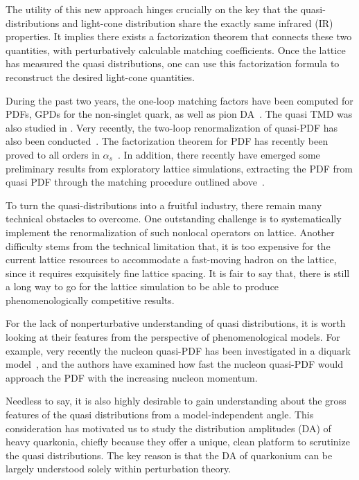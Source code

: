 \documentclass[english,preprint,aps,prd,showpacs,superscriptaddress,nofootinbib,tightenlines]{revtex4}
\begin{document}
The utility of this new approach hinges crucially on the key that the quasi-distributions and
light-cone distribution share the exactly same infrared (IR) properties. It implies there exists a factorization theorem that connects these two quantities,
with perturbatively calculable matching coefficients.
Once the lattice has measured the quasi distributions, one can use this factorization formula to reconstruct
the desired light-cone quantities.

During the past two years, the one-loop matching factors have been computed for PDFs, GPDs for the non-singlet quark,
as well as pion DA~\cite{Xiong:2013bka,Ma:2014jla,Ji:2015qla}. The quasi TMD was also studied in \cite{Ji:2014hxa}.
Very recently, the two-loop renormalization of quasi-PDF has also been conducted~\cite{Ji:2015jwa}.
The factorization theorem for PDF has recently been proved to all orders in $\alpha_s$~\cite{Ma:2014jla}.
In addition, there recently have emerged some preliminary results from exploratory lattice simulations, extracting
the PDF from quasi PDF through the matching procedure outlined above~\cite{Lin:2014zya,Alexandrou:2015rja}.

To turn the quasi-distributions into a fruitful industry,
there remain many technical obstacles to overcome.
One outstanding challenge is to systematically implement the renormalization of such nonlocal operators on lattice.
Another difficulty stems from the technical limitation that, it is too expensive for the current lattice resources to
accommodate a fast-moving hadron on the lattice, since it requires exquisitely fine lattice spacing.
It is fair to say that, there is still a long way to go for the lattice simulation to be able to produce
phenomenologically competitive results.

For the lack of nonperturbative understanding of quasi distributions,
it is worth looking at their features from the perspective of phenomenological models.
For example, very recently the nucleon quasi-PDF has been investigated in a diquark model~\cite{Gamberg:2014zwa},
and the authors have examined how fast the nucleon quasi-PDF would approach the PDF with the increasing nucleon momentum.

Needless to say, it is also highly desirable to gain understanding about the gross features of the quasi distributions
from a model-independent angle. This consideration has motivated us
to study the distribution amplitudes (DA) of heavy quarkonia, chiefly because they offer
a unique, clean platform to scrutinize the quasi distributions. The key reason is that the DA of quarkonium
can be largely understood solely within perturbation theory.
\end{document}
